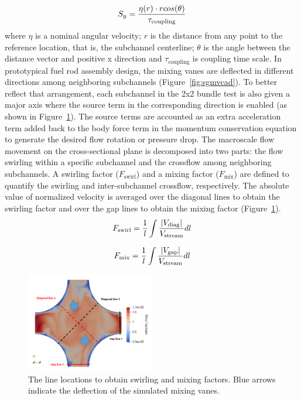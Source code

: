 \begin{equation}
  S_y = \frac{\eta(r)\cdot r cos(\theta)}{\tau_\text{coupling}}\\
\end{equation}
where $\eta$ is a nominal angular velocity;
$r$ is the distance from any point to the reference location, that is, the subchannel centerline;
$\theta$ is the angle between the distance vector and positive x direction and
$\tau_\text{coupling}$ is coupling time scale.
In prototypical fuel rod assembly design, the mixing vanes are deflected in different directions among neighboring subchannels (Figure~\ref{fig:sgmvcad}).
To better reflect that arrangement, each subchannel in the 2x2 bundle test is also given a major axis where the source term in the corresponding direction is enabled (as shown in Figure~\ref{fig:sblines}).
The source terms are accounted as an extra acceleration term added back to the body force term in the momentum conservation equation to generate the desired flow rotation or pressure drop.
The macroscale flow movement on the cross-sectional plane is decomposed into two parts: the flow swirling within a specific subchannel and the crossflow among neighboring subchannels.
A swirling factor ($F_\text{swirl}$) and a mixing factor ($F_\text{mix}$) are defined to quantify the swirling and inter-subchannel crossflow, respectively.
The absolute value of normalized velocity is averaged over the diagonal lines to obtain the swirling factor and over the gap lines to obtain the mixing factor (Figure~\ref{fig:sblines}).
\begin{equation}
  F_\text{swirl} = \frac{1}{l}\int\frac{\left| V_\text{diag} \right|}{V_\text{stream}}dl\\
\end{equation}

\begin{equation}
  F_\text{mix} = \frac{1}{l}\int\frac{\left| V_\text{gap} \right|}{V_\text{stream}}dl\\
\end{equation}

\begin{figure}[!ht]
\centering
\includegraphics[width=0.5\textwidth]{./figures/Analysis_locations_in_a_subchannel.png}
\caption{The line locations to obtain swirling and mixing factors. Blue arrows indicate the deflection of the simulated mixing vanes. }
\label{fig:sblines}
\end{figure}

